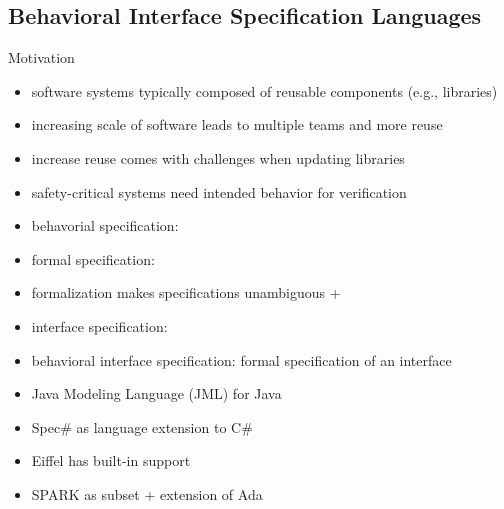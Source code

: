 \subsection{Behavioral Interface Specification Languages}
\begin{frame}{\insertsubsection{} \mytitlesource{\hatcliff}}
	\begin{fancycolumns}[widths={30}]
		\begin{motivation}{Motivation}
			\begin{itemize}
				\item software systems typically composed of reusable components (e.g., libraries)
				\item increasing scale of software leads to multiple teams and more reuse
				\item increase reuse comes with challenges when updating libraries
				\item safety-critical systems need intended behavior for verification %
			\end{itemize}
		\end{motivation}
		\nextcolumn
		\begin{definition}{\insertsubsection}
			\begin{itemize}
				\item behavorial specification: 
				\item formal specification: 
				\item formalization makes specifications unambiguous + 
				\item interface specification: 
				\item behavioral interface specification: formal specification of an interface
			\end{itemize}
		\end{definition}
		\begin{example}{}
			\begin{itemize}
				\item Java Modeling Language (JML) for Java
				\item Spec\# as language extension to C\#
				\item Eiffel has built-in support
				\item SPARK as subset + extension of Ada
			\end{itemize}
		\end{example}
	\end{fancycolumns}
\end{frame}

